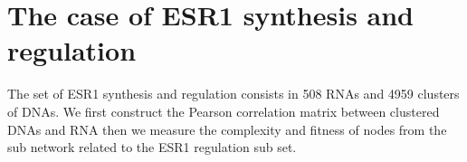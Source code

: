 \documentclass[10pt,a4paper]{article}
\begin{document}
\section{The case of ESR1 synthesis and regulation}
The set of ESR1 synthesis and regulation consists in 508 RNAs and 4959 clusters of DNAs. We first construct the Pearson correlation matrix between clustered DNAs and RNA then we measure the complexity and fitness of nodes from the sub network related to the ESR1 regulation sub set.
\begin{figure}[h!]
\begin{center}
\end{center}
\begin{center}
\end{center}
\end{figure}
\end{document}
